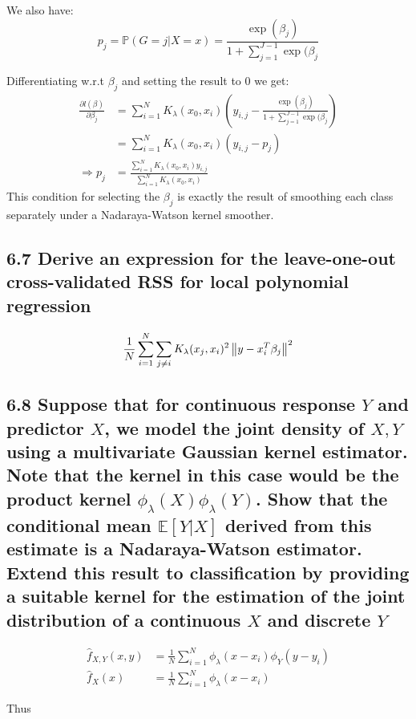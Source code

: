 We also have:
$$p_j = \mathbb{P}(G = j \vert X = x) = \frac{\exp(\beta_j)}{1+\sum_{j=1}^{J-1} \exp(\beta_j}$$

Differentiating w.r.t $\beta_j$ and setting the result to $0$ we get:
\begin{align*}
   \frac{\partial l(\beta)}{\partial \beta_j} &= \sum_{i=1}^N K_\lambda(x_0, x_i) \left(y_{i,j} - \frac{\exp(\beta_j)}{1+\sum_{j=1}^{J-1} \exp(\beta_j}\right) \\
   &= \sum_{i=1}^N K_\lambda(x_0, x_i) \left(y_{i,j} - p_j\right) \\
   \Rightarrow p_j &= \frac{ \sum_{i=1}^N K_\lambda(x_0, x_i) y_{i,j} } {\sum_{i=1}^N K_\lambda(x_0, x_i) }
\end{align*} 
This condition for selecting the $\beta_j$ is exactly the result of smoothing each class separately under a Nadaraya-Watson kernel smoother.

\subsection*{6.7 Derive an expression for the leave-one-out cross-validated RSS for local polynomial regression}

$$\frac{1}{N} \sum_{i=1}^N \sum_{j \neq i} K_\lambda(x_j, x_i)^2 \left\lVert y-x_i^T\beta_j\right\rVert^2$$

\subsection*{6.8 Suppose that for continuous response $Y$ and predictor $X$, we model the joint density of $X,Y$ using a multivariate Gaussian kernel estimator. Note that the kernel in this case would be the product kernel $\phi_\lambda(X)\phi_\lambda(Y)$. Show that the conditional mean $\mathbb{E}\left[Y\vert X\right]$ derived from this estimate is a Nadaraya-Watson estimator. Extend this result to classification by providing a suitable kernel for the estimation of the joint distribution of a continuous $X$ and discrete $Y$}

\begin{align*}
    \hat{f}_{X,Y}(x,y) &= \frac{1}{N} \sum_{i=1}^N \phi_\lambda(x-x_i)\phi_Y(y-y_i)\\
    \hat{f}_{X}(x) &= \frac{1}{N} \sum_{i=1}^N \phi_\lambda(x-x_i)
\end{align*}

Thus 

